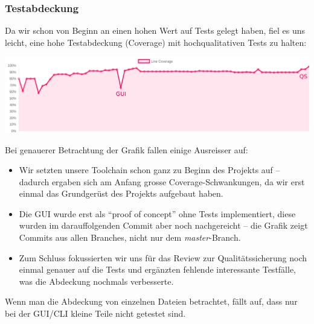 \documentclass[a4paper]{article}
\begin{document}
\subsubsection{Testabdeckung}

Da wir schon von Beginn an einen hohen Wert auf Tests gelegt haben, fiel es uns leicht, eine hohe Testabdeckung (Coverage) mit hochqualitativen Tests zu halten:

\includegraphics[width=\linewidth]{img/coverage.png}

Bei genauerer Betrachtung der Grafik fallen einige Ausreisser auf:

\begin{itemize}
  \item Wir setzten unsere Toolchain schon ganz zu Beginn des Projekts auf --
    dadurch ergaben sich am Anfang grosse Coverage-Schwankungen, da wir erst einmal das Grundgerüst des Projekts aufgebaut haben.
  \item Die GUI wurde erst als ``proof of concept'' ohne Tests implementiert,
    diese wurden im darauffolgenden Commit aber noch nachgereicht -- die Grafik
    zeigt Commits aus allen Branches, nicht nur dem \emph{master}-Branch.
  \item Zum Schluss fokussierten wir uns für das Review zur Qualitätssicherung noch
    einmal genauer auf die Tests und ergänzten fehlende interessante Testfälle,
    was die Abdeckung nochmals verbesserte.
\end{itemize}

Wenn man die Abdeckung von einzelnen Dateien betrachtet, fällt auf, dass nur bei
der GUI/CLI kleine Teile nicht getestet sind.
\end{document}
